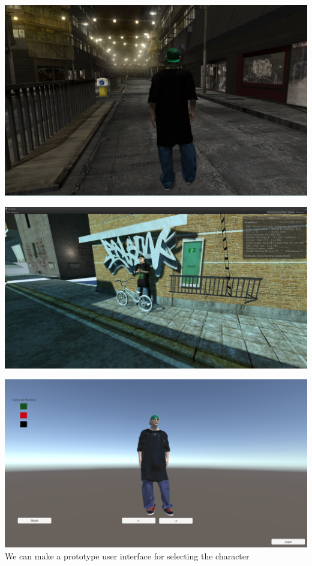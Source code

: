 \documentclass{article}
\begin{document}
  \includegraphics[width=\textwidth]{21.jpg}
  
  \includegraphics[width=\textwidth]{27.jpg}

  \includegraphics[width=\textwidth]{22.png}
  We can make a prototype user interface for selecting the character
\end{document}
